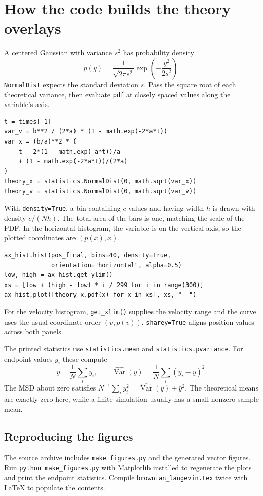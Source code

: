 \documentclass[11pt,a4paper]{article}
\newcommand{\Var}{\operatorname{Var}}
\begin{document}
\section{How the code builds the theory overlays}
A centered Gaussian with variance \(s^2\) has probability density
\[
 p(y)=\frac{1}{\sqrt{2\pi s^2}}\exp\!\left(-\frac{y^2}{2s^2}\right).
\]
\texttt{NormalDist} expects the standard deviation \(s\). Pass the square
root of each theoretical variance, then evaluate \texttt{pdf} at closely spaced
values along the variable's axis.
\begin{lstlisting}
t = times[-1]
var_v = b**2 / (2*a) * (1 - math.exp(-2*a*t))
var_x = (b/a)**2 * (
    t - 2*(1 - math.exp(-a*t))/a
    + (1 - math.exp(-2*a*t))/(2*a)
)
theory_x = statistics.NormalDist(0, math.sqrt(var_x))
theory_v = statistics.NormalDist(0, math.sqrt(var_v))
\end{lstlisting}
With \texttt{density=True}, a bin containing \(c\) values and having width
\(h\) is drawn with density \(c/(Nh)\). The total area of the bars is one,
matching the scale of the PDF. In the horizontal histogram, the variable is
on the vertical axis, so the plotted coordinates are \((p(x),x)\).
\begin{lstlisting}
ax_hist.hist(pos_final, bins=40, density=True,
             orientation="horizontal", alpha=0.5)
low, high = ax_hist.get_ylim()
xs = [low + (high - low) * i / 299 for i in range(300)]
ax_hist.plot([theory_x.pdf(x) for x in xs], xs, "--")
\end{lstlisting}
For the velocity histogram, \texttt{get\_xlim()} supplies the velocity range
and the curve uses the usual coordinate order \((v,p(v))\).
\texttt{sharey=True} aligns position values across both panels.

The printed statistics use \texttt{statistics.mean} and
\texttt{statistics.pvariance}. For endpoint values \(y_i\) these compute
\[
 \bar y=\frac{1}{N}\sum_i y_i,\qquad
 \widehat{\Var}(y)=\frac{1}{N}\sum_i(y_i-\bar y)^2.
\]
The MSD about zero satisfies \(N^{-1}\sum_i y_i^2=\widehat{\Var}(y)+\bar y^2\).
The theoretical means are exactly zero here, while a finite simulation
usually has a small nonzero sample mean.

\subsection*{Reproducing the figures}
The source archive includes \texttt{make\_figures.py} and the generated vector
figures. Run \texttt{python make\_figures.py} with Matplotlib installed to
regenerate the plots and print the endpoint statistics. Compile
\texttt{brownian\_langevin.tex} twice with LaTeX to populate the contents.
\end{document}
